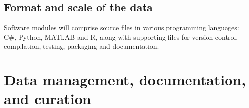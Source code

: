 \documentclass[a4paper,11pt]{article}
\renewcommand{\footnote}[1]{ [#1]}
\begin{document}

\subsection{Format and scale of the data}


Software modules will comprise source files in various programming languages: C\#, Python, MATLAB and R, along with supporting files for version control, compilation, testing, packaging and documentation.


\section{Data management, documentation, and curation}

\end{document}
